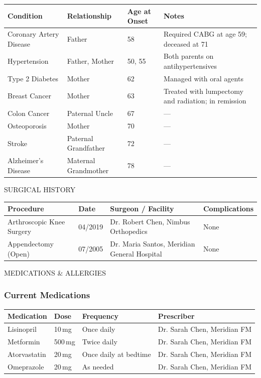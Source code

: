 \documentclass[11pt,letterpaper]{article}
\begin{document}
\begin{tabularx}{\textwidth}{L{1.7in}L{1.5in}L{1.2in}X}
\toprule
{}
\textbf{Condition} & \textbf{Relationship} & \textbf{Age at Onset} & \textbf{Notes} \\
\midrule
Coronary Artery Disease & Father & 58 & Required CABG at age 59; deceased at 71\\
Hypertension & Father, Mother & 50, 55 & Both parents on antihypertensives\\
Type 2 Diabetes & Mother & 62 & Managed with oral agents\\
Breast Cancer & Mother & 63 & Treated with lumpectomy and radiation; in remission\\
Colon Cancer & Paternal Uncle & 67 & ---\\
Osteoporosis & Mother & 70 & ---\\
Stroke & Paternal Grandfather & 72 & ---\\
Alzheimer's Disease & Maternal Grandmother & 78 & ---\\
\bottomrule
\end{tabularx}

\begin{secbox}
SURGICAL HISTORY
\end{secbox}

\begin{tabularx}{\textwidth}{L{2.0in}L{1.4in}L{1.6in}L{1.4in}}
\toprule
{}
\textbf{Procedure} & \textbf{Date} & \textbf{Surgeon / Facility} & \textbf{Complications} \\
\midrule
Arthroscopic Knee Surgery & 04/2019 & Dr. Robert Chen, Nimbus Orthopedics & None\\
Appendectomy (Open) & 07/2005 & Dr. Maria Santos, Meridian General Hospital & None\\
\bottomrule
\end{tabularx}

\vspace{8pt}

\begin{secbox}
MEDICATIONS \& ALLERGIES
\end{secbox}

\subsubsection*{Current Medications}
\begin{tabularx}{\textwidth}{L{2.0in}L{1.2in}L{1.3in}L{1.9in}}
\toprule
{}
\textbf{Medication} & \textbf{Dose} & \textbf{Frequency} & \textbf{Prescriber} \\
\midrule
Lisinopril & 10\,mg & Once daily & Dr. Sarah Chen, Meridian FM\\
Metformin & 500\,mg & Twice daily & Dr. Sarah Chen, Meridian FM\\
Atorvastatin & 20\,mg & Once daily at bedtime & Dr. Sarah Chen, Meridian FM\\
Omeprazole & 20\,mg & As needed & Dr. Sarah Chen, Meridian FM\\
\bottomrule
\end{tabularx}
\end{document}
